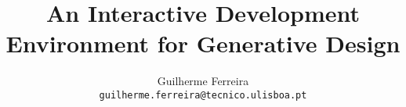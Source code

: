 \documentclass[runningheads,a4paper]{./llncs2e/llncs}
\begin{document}
\title{An Interactive Development Environment for Generative Design}
\author{Guilherme Ferreira \\ \texttt{guilherme.ferreira@tecnico.ulisboa.pt}}

\maketitle










\newpage
\appendix


% 
% 
 

 
\end{document}

